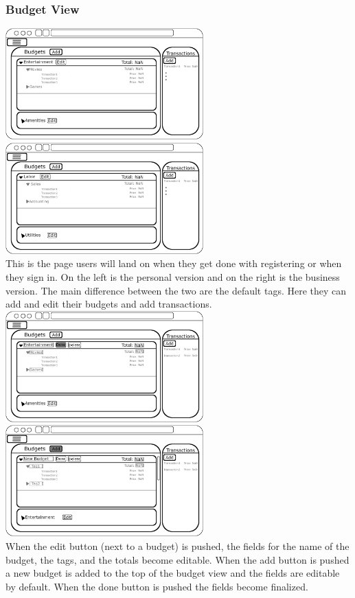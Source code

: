\documentclass[12pt]{article}
\begin{document}
\subsubsection{Budget View}
\includegraphics[width=3in]{BudgetPagePersonal.png}
\includegraphics[width=3in]{BudgetPageBusiness.png}\\
This is the page users will land on when they get done with registering or when they sign in. On the left is the personal version and on the right is the business version. The main difference between the two are the default tags. Here they can add and edit their budgets and add transactions.\\

\includegraphics[width=3in]{BudgetPageEditPushed.png}
\includegraphics[width=3in]{BudgetPageAddPushed.png}\\
When the edit button (next to a budget) is pushed, the fields for the name of the budget, the tags, and the totals become editable. When the add button is pushed a new budget is added to the top of the budget view and the fields are editable by default. When the done button is pushed the fields become finalized.\\
\end{document}

